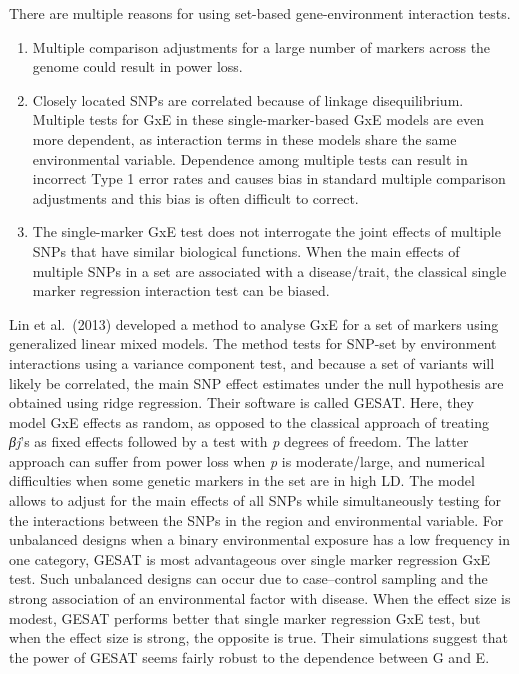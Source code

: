 \documentclass[
]{book}
\providecommand{\tightlist}{%
  \setlength{\itemsep}{0pt}\setlength{\parskip}{0pt}}
\begin{document}
There are multiple reasons for using set-based gene-environment interaction tests.

\begin{enumerate}
\def\labelenumi{\arabic{enumi}.}
\tightlist
\item
  Multiple comparison adjustments for a large number of markers across the genome could result in power loss.
\item
  Closely located SNPs are correlated because of linkage disequilibrium. Multiple tests for GxE in these single-marker-based GxE models are even more dependent, as interaction terms in these models share the same environmental variable. Dependence among multiple tests can result in incorrect Type 1 error rates and causes bias in standard multiple comparison adjustments and this bias is often difficult to correct.
\item
  The single-marker GxE test does not interrogate the joint effects of multiple SNPs that have similar biological functions. When the main effects of multiple SNPs in a set are associated with a disease/trait, the classical single marker regression interaction test can be biased.
\end{enumerate}

Lin et al.~(2013) developed a method to analyse GxE for a set of markers using generalized linear mixed models. The method tests for SNP-set by environment interactions using a variance component test, and because a set of variants will likely be correlated, the main SNP effect estimates under the null hypothesis are obtained using ridge regression.
Their software is called GESAT. Here, they model GxE effects as random, as opposed to the classical approach of treating \emph{βj}'s as fixed effects followed by a test with \emph{p} degrees of freedom. The latter approach can suffer from power loss when \emph{p} is moderate/large, and numerical difficulties when some genetic markers in the set are in high LD.
The model allows to adjust for the main effects of all SNPs while simultaneously testing for the interactions between the SNPs in the region and environmental variable. For unbalanced designs when a binary environmental exposure has a low frequency in one category, GESAT is most advantageous over single marker regression GxE test. Such unbalanced designs can occur due to case--control sampling and the strong association of an environmental factor with disease. When the effect size is modest, GESAT performs better that single marker regression GxE test, but when the effect size is strong, the opposite is true.
Their simulations suggest that the power of GESAT seems fairly robust to the dependence between G and E.
\end{document}
